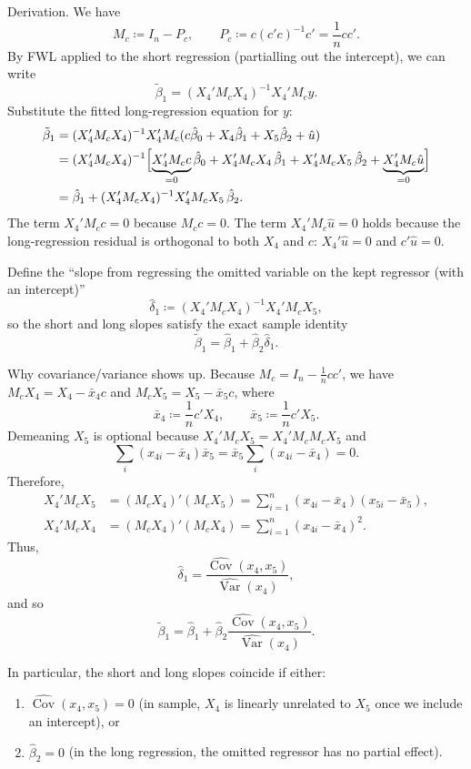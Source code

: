 \begin{remark}
	Derivation.
	We have
	\[
		M_c \coloneqq I_n - P_c, \qquad P_c \coloneqq c(c'c)^{-1}c' = \frac{1}{n}cc'.
	\]
	By FWL applied to the short regression (partialling out the intercept), we can write
	\[
		\tilde{\beta}_1 = (X_4' M_c X_4)^{-1} X_4' M_c y.
	\]
	Substitute the fitted long-regression equation for $y$:
	\begin{align*}
		\tilde{\beta}_1
		&= (X_4' M_c X_4)^{-1} X_4' M_c (c\hat{\beta}_0 + X_4\hat{\beta}_1 + X_5\hat{\beta}_2 + \hat{u}) \\
		&= (X_4' M_c X_4)^{-1}\Bigl[
			\underbrace{X_4'M_c c}_{=0}\hat{\beta}_0
			+ X_4'M_c X_4\,\hat{\beta}_1
			+ X_4'M_c X_5\,\hat{\beta}_2
			+ \underbrace{X_4'M_c \hat{u}}_{=0}
		\Bigr] \\
		&= \hat{\beta}_1 + (X_4' M_c X_4)^{-1} X_4' M_c X_5 \,\hat{\beta}_2.
	\end{align*}
	The term $X_4'M_cc=0$ because $M_c c=0$.
	The term $X_4'M_c\hat{u}=0$ holds because the long-regression residual is orthogonal to both $X_4$ and $c$:
	$X_4'\hat{u}=0$ and $c'\hat{u}=0$.

	Define the ``slope from regressing the omitted variable on the kept regressor (with an intercept)''
	\[
		\hat{\delta}_1 \coloneqq (X_4' M_c X_4)^{-1} X_4' M_c X_5,
	\]
	so the short and long slopes satisfy the exact sample identity
	\[
		\tilde{\beta}_1 = \hat{\beta}_1 + \hat{\beta}_2 \hat{\delta}_1.
	\]

	Why covariance/variance shows up.
	Because $M_c = I_n - \frac{1}{n}cc'$, we have $M_cX_4=X_4-\bar{x}_4 c$ and $M_cX_5=X_5-\bar{x}_5 c$, where
	\[
		\bar{x}_4 \coloneqq \frac{1}{n}c'X_4, \qquad \bar{x}_5 \coloneqq \frac{1}{n}c'X_5.
	\]
		Demeaning $X_5$ is optional because $X_4'M_cX_5 = X_4'M_c M_cX_5$ and
		\[
			\sum_i (x_{4i} - \bar{x}_4)\bar{x}_5 = \bar{x}_5 \sum_i (x_{4i} - \bar{x}_4) = 0
		.\]
		Therefore,
	\begin{align*}
		X_4' M_c X_5
		&= (M_cX_4)'(M_cX_5)
		= \sum_{i=1}^n (x_{4i}-\bar{x}_4)(x_{5i}-\bar{x}_5), \\
		X_4' M_c X_4
		&= (M_cX_4)'(M_cX_4)
		= \sum_{i=1}^n (x_{4i}-\bar{x}_4)^2.
	\end{align*}
	Thus,
	\[
		\hat{\delta}_1 = \frac{\widehat{\operatorname{Cov}}(x_4,x_5)}{\widehat{\operatorname{Var}}(x_4)},
	\]
	and so
	\[
		\tilde{\beta}_1
		= \hat{\beta}_1 + \hat{\beta}_2 \frac{\widehat{\operatorname{Cov}}(x_4,x_5)}{\widehat{\operatorname{Var}}(x_4)}.
	\]

	In particular, the short and long slopes coincide if either:
	\begin{enumerate}[label=(\arabic*)]
		\item $\widehat{\operatorname{Cov}}(x_4,x_5)=0$ (in sample, $X_4$ is linearly unrelated to $X_5$ once we include an intercept), or
		\item $\hat{\beta}_2=0$ (in the long regression, the omitted regressor has no partial effect).
	\end{enumerate}
\end{remark}

